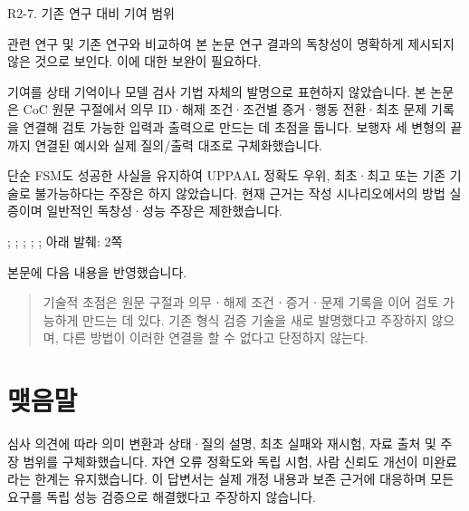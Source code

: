 \begin{reviewitem}{R2-7. 기존 연구 대비 기여 범위}

\begin{reviewercomment}

관련 연구 및 기존 연구와 비교하여 본 논문 연구 결과의 독창성이 명확하게 제시되지 않은 것으로 보인다. 이에 대한 보완이 필요하다.

\end{reviewercomment}

\begin{authorresponse}

기여를 상태 기억이나 모델 검사 기법 자체의 발명으로 표현하지 않았습니다. 본 논문은 CoC 원문 구절에서 의무 ID·해제 조건·조건별 증거·행동 전환·최초 문제 기록을 연결해 검토 가능한 입력과 출력으로 만드는 데 초점을 둡니다. 보행자 세 변형의 끝까지 연결된 예시와 실제 질의/출력 대조로 구체화했습니다.

단순 FSM도 성공한 사실을 유지하여 UPPAAL 정확도 우위, 최초·최고 또는 기존 기술로 불가능하다는 주장은 하지 않았습니다. 현재 근거는 작성 시나리오에서의 방법 실증이며 일반적인 독창성·성능 주장은 제한했습니다.

\end{authorresponse}

\begin{manuscriptrevision}{; ; ; ; ; 아래 발췌: 2쪽}

본문에 다음 내용을 반영했습니다.

\begin{quote}

기술적 초점은 원문 구절과 의무ㆍ해제 조건ㆍ증거ㆍ문제 기록을 이어 검토 가능하게 만드는 데 있다. 기존 형식 검증 기술을 새로 발명했다고 주장하지 않으며, 다른 방법이 이러한 연결을 할 수 없다고 단정하지 않는다.

\end{quote}

\end{manuscriptrevision}

\end{reviewitem}

\section*{맺음말}

심사 의견에 따라 의미 변환과 상태·질의 설명, 최초 실패와 재시험, 자료 출처 및 주장 범위를 구체화했습니다. 자연 오류 정확도와 독립 시험, 사람 신뢰도 개선이 미완료라는 한계는 유지했습니다. 이 답변서는 실제 개정 내용과 보존 근거에 대응하며 모든 요구를 독립 성능 검증으로 해결했다고 주장하지 않습니다.


